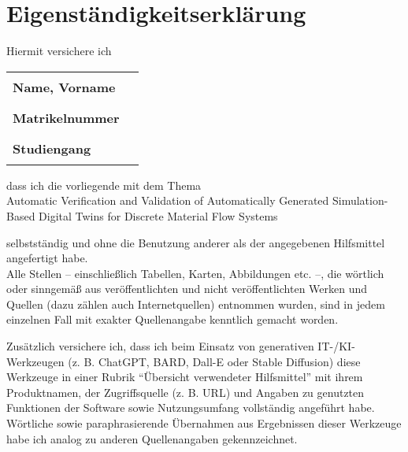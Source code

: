\chapter*{Eigenständigkeitserklärung}
\thispagestyle{plain}

\vspace{1.5em}

Hiermit versichere ich

\vspace{1em}

\noindent
\begin{tabular}{ll}
  \textbf{Name, Vorname}  & \rule{8cm}{0.4pt} \\
  \textbf{Matrikelnummer} & \rule{8cm}{0.4pt} \\
  \textbf{Studiengang}    & \rule{8cm}{0.4pt}
\end{tabular}

\vspace{1.5em}

\noindent
dass ich die vorliegende mit dem Thema \\

Automatic Verification and Validation of Automatically Generated Simulation-Based Digital Twins for Discrete Material Flow Systems \\

\vspace{1.5em}

\noindent
selbstständig und ohne die Benutzung anderer als der angegebenen Hilfsmittel angefertigt habe. \\
Alle Stellen – einschließlich Tabellen, Karten, Abbildungen etc. –, die wörtlich oder sinngemäß aus veröffentlichten und nicht veröffentlichten Werken und Quellen (dazu zählen auch Internetquellen) entnommen wurden, sind in jedem einzelnen Fall mit exakter Quellenangabe kenntlich gemacht worden. \\

\vspace{1.5em}

\noindent
Zusätzlich versichere ich, dass ich beim Einsatz von generativen IT-/KI-Werkzeugen (z. B. ChatGPT, BARD, Dall-E oder Stable Diffusion) diese Werkzeuge in einer Rubrik \enquote{Übersicht verwendeter Hilfsmittel} mit ihrem Produktnamen, der Zugriffsquelle (z. B. URL) und Angaben zu genutzten Funktionen der Software sowie Nutzungsumfang vollständig angeführt habe. Wörtliche sowie paraphrasierende Übernahmen aus Ergebnissen dieser Werkzeuge habe ich analog zu anderen Quellenangaben gekennzeichnet. \\

